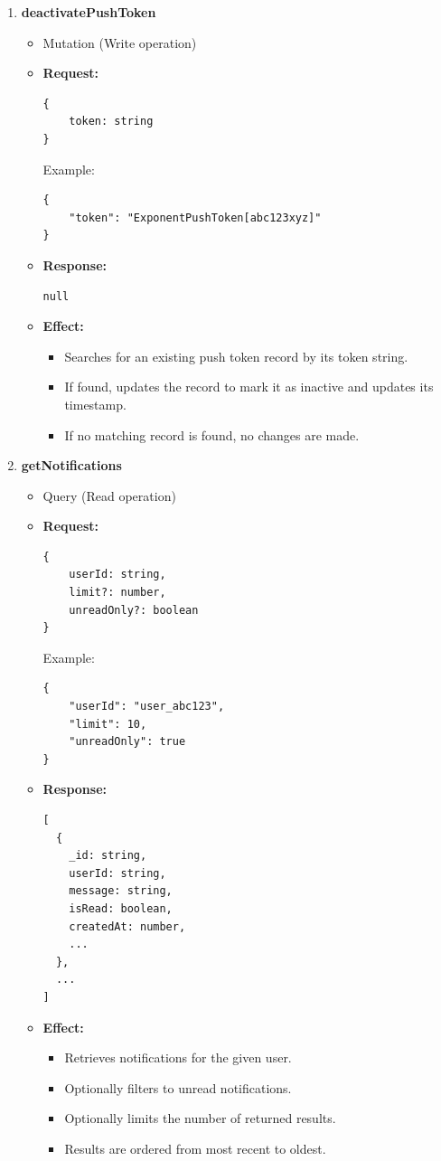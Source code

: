 \documentclass[a4paper,12pt]{article}
\begin{document}
\begin{enumerate}
    \item \textbf{deactivatePushToken}
    \begin{itemize}
        \item Mutation (Write operation)
        \item \textbf{Request:}
        \begin{verbatim}
{
    token: string
}
        \end{verbatim}
        Example:
        \begin{verbatim}
{
    "token": "ExponentPushToken[abc123xyz]"
}
        \end{verbatim}
        \item \textbf{Response:}
        \begin{verbatim}
null
        \end{verbatim}
        \item \textbf{Effect:}
        \begin{itemize}
            \item Searches for an existing push token record by its token string.
            \item If found, updates the record to mark it as inactive and updates its timestamp.
            \item If no matching record is found, no changes are made.
        \end{itemize}
    \end{itemize}

    \item \textbf{getNotifications}
    \begin{itemize}
        \item Query (Read operation)
        \item \textbf{Request:}
        \begin{verbatim}
{
    userId: string,
    limit?: number,
    unreadOnly?: boolean
}
        \end{verbatim}
        Example:
        \begin{verbatim}
{
    "userId": "user_abc123",
    "limit": 10,
    "unreadOnly": true
}
        \end{verbatim}
        \item \textbf{Response:}
        \begin{verbatim}
[
  {
    _id: string,
    userId: string,
    message: string,
    isRead: boolean,
    createdAt: number,
    ...
  },
  ...
]
        \end{verbatim}
        \item \textbf{Effect:}
        \begin{itemize}
            \item Retrieves notifications for the given user.
            \item Optionally filters to unread notifications.
            \item Optionally limits the number of returned results.
            \item Results are ordered from most recent to oldest.
        \end{itemize}
    \end{itemize}


\end{enumerate}
\end{document}
